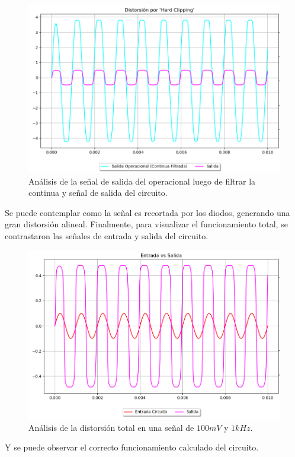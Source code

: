 \begin{figure}[H]
	\centering
	\includegraphics[width=1\textwidth, trim={0 0 0 0}, clip]{Ejercicio5/Imagenes/Circuito_base/Sim/circuito_base_tran_vclip_vo.png}
	\caption{Análisis de la señal de salida del operacional luego de filtrar la continua y señal de salida del circuito.}
	\label{fig:sim_base}
\end{figure}
Se puede contemplar como la señal es recortada por los diodos, generando una gran distorsión alineal.
Finalmente, para visualizar el funcionamiento total, se contrastaron las señales de entrada y salida del circuito.
\begin{figure}[H]
	\centering
	\includegraphics[width=1\textwidth, trim={0 0 0 0}, clip]{Ejercicio5/Imagenes/Circuito_base/Sim/circuito_base_tran_vi_vo.png}
	\caption{Análisis de la distorsión total en una señal de $100mV$ y $1kHz$.}
	\label{fig:sim_base}
\end{figure}
Y se puede observar el correcto funcionamiento calculado del circuito.
